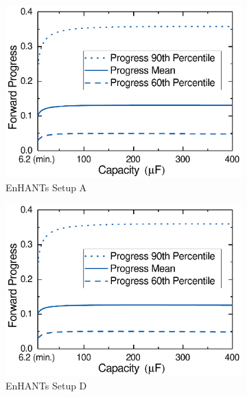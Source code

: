 \begin{figure}[!t]
    \centering
    \begin{subfigure}{0.49\columnwidth}
        \centering
        \includegraphics[width=\columnwidth]{ch4_sizingapproach/figures/HarvStorRan2Fig1}
        \caption{EnHANTs Setup A}
        \label{fig:harvstorrange1}
    \end{subfigure}
    \begin{subfigure}{0.49\columnwidth}
        \centering
        \includegraphics[width=\columnwidth]{ch4_sizingapproach/figures/HarvStorRan2Fig2}
        \caption{EnHANTs Setup D}
        \label{fig:harvstorrange2}
    \end{subfigure}
    \hfil
    \begin{subfigure}{0.49\columnwidth}

\end{subfigure}
\end{figure}
